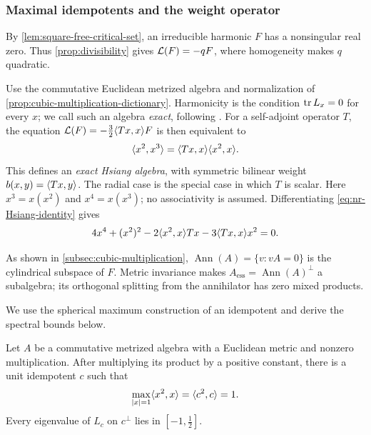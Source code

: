 \subsubsection{Maximal idempotents and the weight operator}
\label{subsec:nr-maximal-idempotents}

By \cref{lem:square-free-critical-set}, an irreducible harmonic $F$
has a nonsingular real zero. Thus \cref{prop:divisibility}
gives $\mathcal L(F)=-qF$, where homogeneity makes $q$ quadratic.

Use the commutative Euclidean metrized algebra and normalization of
\cref{prop:cubic-multiplication-dictionary}.
Harmonicity is the condition $\operatorname{tr} L_x=0$ for every $x$;
we call such an algebra \emph{exact}, following
\cite[Section~3.2 and Definition~4.1]{FoxTkachev24}.
For a self-adjoint operator \(T\), the equation
\(\mathcal L(F)=-\frac32\langle Tx,x\rangle F\) is then equivalent to
\begin{equation}\label{eq:nr-Hsiang-identity}
 \langle x^2,x^3\rangle=\langle Tx,x\rangle\langle x^2,x\rangle.
\end{equation}
This defines an \emph{exact Hsiang algebra}, with symmetric bilinear weight
$b(x,y)=\langle Tx,y\rangle$. The radial case is the special case in which
$T$ is scalar.
Here \(x^3=x(x^2)\) and \(x^4=x(x^3)\); no associativity is assumed.
Differentiating \eqref{eq:nr-Hsiang-identity} gives
\begin{equation}\label{eq:nr-vector-identity}
 4x^4+(x^2)^2-2\langle x^2,x\rangle Tx-3\langle Tx,x\rangle x^2=0.
\end{equation}

As shown in \cref{subsec:cubic-multiplication},
$\operatorname{Ann}(A)=\{v:vA=0\}$ is the cylindrical subspace of $F$.
Metric invariance makes $A_{\mathrm{ess}}=\operatorname{Ann}(A)^\perp$
a subalgebra; its orthogonal splitting from the annihilator has zero
mixed products.

We use the spherical maximum construction of an idempotent
\cite[Lemma~6.6.1]{NadirashviliTkachevVladut14} and derive the spectral
bounds below.

\begin{lemma}\label{lem:nr-max-idempotent}
Let \(A\) be a commutative metrized algebra with a Euclidean metric
and nonzero multiplication. After multiplying its product
by a positive constant, there is a unit idempotent \(c\) such that
\begin{equation}\label{eq:nr-spherical-maximum}
 \max_{|x|=1}\langle x^2,x\rangle=\langle c^2,c\rangle=1.
\end{equation}
Every eigenvalue of \(L_c\) on \(c^\perp\) lies in
\([-1,\frac12]\).
\end{lemma}

